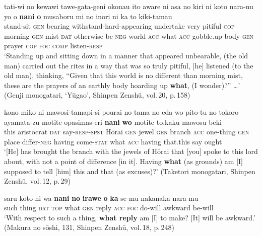 \documentclass[output=paper]{LSP/langsci}
\begin{document}
\begin{exe}
\ex%
\label{07-fr-ex:48}
\gll tati-wi no kewawi tawe-gata-geni okonau ito aware ni asa no kiri ni koto nara-nu yo o \textbf{nani} \textbf{o} musaboru mi no inori ni ka to kiki-tamau\\
stand-sit \textsc{gen} bearing withstand-hard-appearing undertake very pitiful \textsc{cop} morning \textsc{gen} mist \textsc{dat} otherwise be-\textsc{neg} world \textsc{acc} what \textsc{acc}  gobble.up body \textsc{gen} prayer \textsc{cop} \textsc{foc} \textsc{comp} listen-\textsc{resp}\\
\glt ‘Standing up and sitting down in a manner that appeared unbearable, (the old man) carried out the rites in a way that was so truly pitiful, [he] listened (to the old man), thinking, “Given that this world is no different than morning mist, these are the prayers of an earthly body hoarding up \textbf{what}, (I wonder)?” …’ (Genji monogatari, ‘Yūgao’, Shinpen Zenshū, vol.\,20, p.\,158)
\end{exe}

\begin{exe}
\ex%
\label{07-fr-ex:49}
\gll kono miko ni mawosi-tamapi-si pourai no tama no eda wo pito-tu no tokoro ayamata-zu motite opasimas-eri \textbf{nani} \textbf{wo} motite to.kaku mawosu beki\\
this aristocrat \textsc{dat} say-\textsc{resp}-\textsc{spst} Hōrai \textsc{gen} jewel \textsc{gen} branch \textsc{acc} one-thing \textsc{gen} place differ-\textsc{neg} having come-\textsc{stat} what \textsc{acc} having that.this say ought\\
\glt ‘[He] has brought the branch with the jewels of Hōrai that [you] spoke to this lord about, with not a point of difference [in it]. Having \textbf{what} (as grounds) am [I] supposed to tell [him] this and that (as excuses)?’ (Taketori monogatari, Shinpen Zenshū, vol.\,12, p.\,29)\\
\end{exe}

\begin{exe}
\ex%
\label{07-fr-ex:50}
\gll saru koto ni wa \textbf{nani} \textbf{no} \textbf{irawe} \textbf{o} \textbf{ka} se-mu nakanaka nara-mu\\
such thing \textsc{dat} \textsc{top}  what \textsc{gen} reply \textsc{acc} \textsc{foc}  do-will awkward be-will\\
\glt ‘With respect to such a thing, \textbf{what reply} am [I] to make? [It] will be awkward.’ (Makura no sōshi, 131, Shinpen Zenshū, vol.\,18, p.\,248)
\end{exe}
\end{document}
